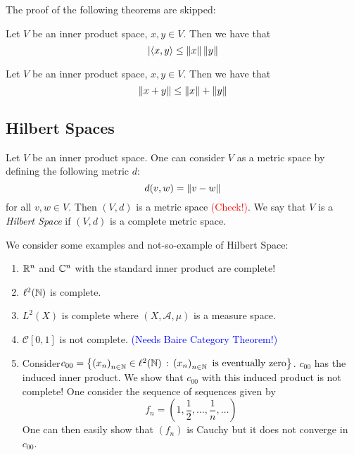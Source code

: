 The proof of the following theorems are skipped:
\begin{theorem}
    Let $V$ be an inner product space, $x,y \in V$. Then we have that 
    \begin{equation*}
	\lvert \left\langle x,y \right\rangle \le \left\lVert x \right\rVert\left\lVert y \right\rVert
    \end{equation*}
    \label{thm:CS-inequality}
\end{theorem}

\begin{theorem}
    Let $V$ be an inner product space, $x,y \in V$. Then we have that 
    \begin{equation*}
	\left\lVert x+y \right\rVert \le \left\lVert x \right\rVert + \left\lVert y \right\rVert
    \end{equation*}
    \label{thm:triangle-inequality}
\end{theorem}

\subsection{Hilbert Spaces}
\begin{definition}
    Let $V$ be an inner product space. One can consider $V$ as a metric space by defining the following metric $d$:
    \begin{equation*}
	d(v,w) = \left\lVert v-w \right\rVert
    \end{equation*}
    for all $v,w \in V$. Then $(V,d)$ is a metric space \textcolor{red}{(Check!)}. We say that $V$ is a \textit{Hilbert Space} if $(V,d)$ is a complete metric space.
    \label{def:Hilbert-Space}
\end{definition}

\begin{example} We consider some examples and not-so-example of Hilbert Space:
\begin{enumerate}
    \item $\mathbb R ^{n}$ and $\mathbb C ^{n}$ with the standard inner product are complete!
    \item $\ell ^{2} (\mathbb N )$ is complete.
    \item $L^2(X)$ is complete where $(X, \mathscr A , \mu)$ is a measure space.
    \item $\mathcal {C} [0,1]$ is not complete. \textcolor{blue}{(Needs Baire Category Theorem!)}
    \item Consider$c_{00} = \left\{ \left( x_{n} \right)_{n\in \mathbb N} \in \ell ^{2} (\mathbb N) \, : \, \left( x_{n} \right) _{n \in \mathbb N} \text{ is eventually zero} \right\}$. $c_{00}$ has the induced inner product. We show that $c_{00}$ with this induced product is not complete!
	One consider the sequence of sequences given by
	\begin{equation*}
	    f_{n} = \left( 1, \frac{1}{2} , \ldots , \frac{1}{n} , \ldots \right)
	\end{equation*}
	One can then easily show that $\left( f_n \right)$ is Cauchy but it does not converge in $c_{00}$.
\end{enumerate}
    
\end{example}
